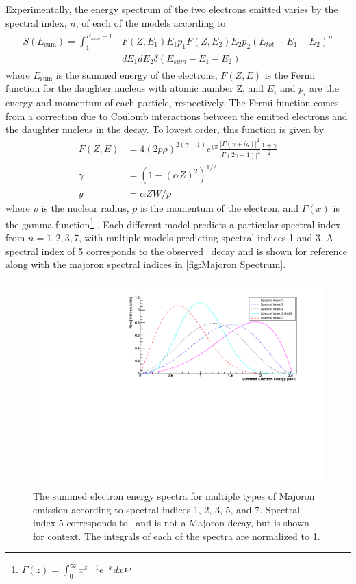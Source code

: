 Experimentally, the energy spectrum of the two electrons emitted varies by the spectral index, $n$, of each of the models according to
\begin{align}
\begin{split}\label{eq:spectral index}
    S(E_{\textrm{sum}}) = \int_1^{E_{sum}-1}&F(Z, E_1) E_1 p_1 F(Z, E_2) E_2 p_2 (E_{tot}-E_1-E_2)^n \\
    & dE_1 dE_2 \delta(E_{sum}-E_1-E_2)
\end{split}
\end{align}
where $E_{\textrm{sum}}$ is the summed energy of the electrons, $F(Z, E)$ is the Fermi function for the daughter nucleus with atomic number Z, and $E_i$ and $p_i$ are the energy and momentum of each particle, respectively.
The Fermi function comes from a correction due to Coulomb interactions between the emitted electrons and the daughter nucleus in the decay.
To lowest order, this function is given by 
\begin{align}
    F(Z,E) &= 4(2 p \rho)^{2(\gamma - 1)}e^{y\pi} \frac{|\Gamma(\gamma+iy)|^2}{|\Gamma(2\gamma+1)|^2}\frac{1+\gamma}{2} \\
    \gamma &= (1-(\alpha Z)^2)^{1/2} \\
    y &= \alpha Z W / p
\end{align}
where $\rho$ is the nuclear radius, $p$ is the momentum of the electron, and $\Gamma(x)$ is the gamma function\footnote{$\Gamma(z)=\int_0^\infty x^{z-1}e^{-x}dx$} \cite{PhysRev.150.846}.
Each different model predicts a particular spectral index from $n=1,2,3,7$, with multiple models predicting spectral indices 1 and 3.
A spectral index of 5 corresponds to the observed \twonubb~decay and is shown for reference along with the majoron spectral indices in \autoref{fig:Majoron Spectrum}.

\begin{figure}[htbp]
    \centering
    \includegraphics[width=0.9\linewidth]{Figures/EnergySpectrum_fixedFermi.pdf}
    \caption[The summed electron energy spectra for multiple types of Majoron emission according to spectral indices 1, 2, 3, 5, and 7.]
    {The summed electron energy spectra for multiple types of Majoron emission according to spectral indices 1, 2, 3, 5, and 7.
    Spectral index 5 corresponds to \twonubb~and is not a Majoron decay, but is shown for context.
    The integrals of each of the spectra are normalized to 1.}
    \label{fig:Majoron Spectrum}
\end{figure}


